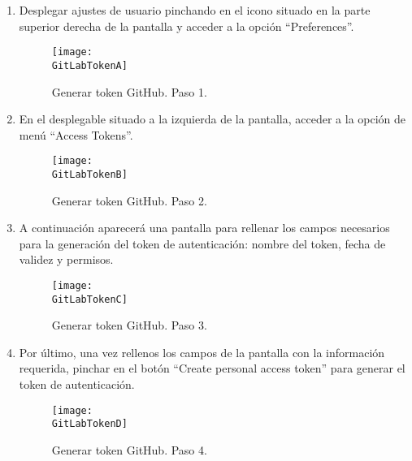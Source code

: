 \begin{enumerate}
    \item Desplegar ajustes de usuario pinchando en el icono situado en la parte superior derecha de la pantalla y acceder a la opción ``Preferences''.

    \begin{figure}[h]
        \centering
        \texttt{[image: \\GitLabTokenA]}
        \caption{Generar token GitHub. Paso 1.}
    \end{figure}

    \item En el desplegable situado a la izquierda de la pantalla, acceder a la opción de menú ``Access Tokens''.

    \begin{figure}[h]
        \centering
        \texttt{[image: \\GitLabTokenB]}
        \caption{Generar token GitHub. Paso 2.}
    \end{figure}

    \item A continuación aparecerá una pantalla para rellenar los campos necesarios para la generación del token de autenticación: nombre del token, fecha de validez y permisos.
    
    \begin{figure}[h]
        \centering
        \texttt{[image: \\GitLabTokenC]}
        \caption{Generar token GitHub. Paso 3.}
    \end{figure}

    \item Por último, una vez rellenos los campos de la pantalla con la información requerida, pinchar en el botón ``Create personal access token'' para generar el token de autenticación.

    \begin{figure}[h]
        \centering
        \texttt{[image: \\GitLabTokenD]}
        \caption{Generar token GitHub. Paso 4.}
    \end{figure}

\end{enumerate}